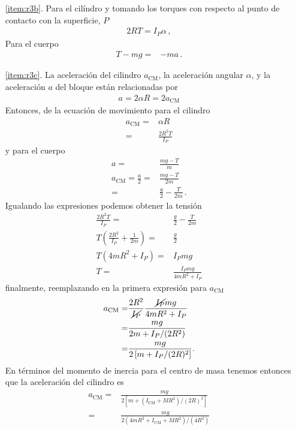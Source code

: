 \begin{itemize}
\item[\ref{item:r3b}.] Para el cilíndro y tomando los torques con respecto al punto de contacto con la superficie, $P$
  \begin{align*}
    2 R T=I_P \alpha\,,
  \end{align*}
Para el cuerpo
\begin{align*}
  T-m g=&-ma\,.
\end{align*}
\item[\ref{item:r3c}.] La aceleración del cilindro $a_{\text{CM}}$, la aceleración angular $\alpha$, y la aceleración $a$ del bloque están relacionadas por
  \begin{align*}
    a=2\alpha R=2 a_{\text{CM}}
  \end{align*}
Entonces, de la ecuación de movimiento para el cilindro
\begin{align*}
  a_{\text{CM}}=&\alpha R\\
  =&\frac{2 R^2 T}{I_P}
\end{align*}
y para el cuerpo
\begin{align*}
  a=&\frac{mg-T}{m}\\
  a_{\text{CM}}=\frac{a}{2}=&\frac{mg-T}{2m}\\
  =&\frac{g}{2}-\frac{T}{2m}\,.
\end{align*}
Igualando las expresiones podemos obtener la tensión
\begin{align*}
\frac{2R^2T}{I_P}=&\frac{g}{2}-\frac{T}{2m}\\
T \left(\frac{2R^2}{I_P}+\frac{1}{2m}  \right)=&\frac{g}{2}\\
T \left( 4m R^2+I_P \right)=&I_P m g\\
T=&\frac{I_P mg}{4m R^2+I_P}
\end{align*}
finalmente, reemplazando en la primera expresión para $a_{\text{CM}}$
\begin{align}
\label{eq:acmcil}
  a_{\text{CM}}=&\frac{2R^2}{\cancel{I_P}}\frac{\cancel{I_P} mg}{4m R^2+I_P}\nonumber\\
=&\frac{mg}{2m +I_P/(2R^2)}\nonumber\\
=&\frac{mg}{2 \left[m +I_P/(2R)^2  \right]}.
\end{align}
En términos del momento de inercia para el centro de masa tenemos entonces que la aceleración del cilindro es
\begin{align*}
  a_{\text{CM}}=&  \frac{mg}{2 \left[ m+(I_{\text{CM}}+MR^2)/(2R)^2\right]}\nonumber\\
  =&  \frac{mg}{2  (4 m R^2+I_{\text{CM}}+MR^2)/(4R^2)}\nonumber\\

\end{align*}
\end{itemize}
